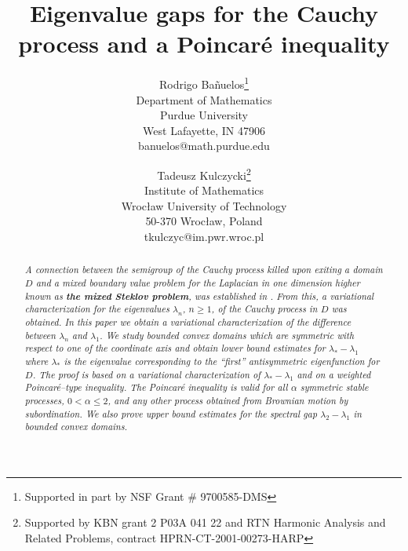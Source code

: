 \documentclass[11pt,leqno]{article}
\theoremstyle{definition}
\numberwithin{equation}{section}
\begin{document}
\newcommand{\bD}{\mathrm{I\! D\!}}


\newcommand{\al}{\alpha}
\newcommand{\ga}{\gamma}
\newcommand{\om}{\omega}
\newcommand{\G}{\Gamma}
\def\rayo{\leftarrow}
\def\tr{\triangle}
\newtheorem{cl}{Claim}
\newcommand{\bR}{\mathbf{R}}

\theoremstyle{definition}
\newtheorem{fact}{Fact} \renewcommand{\thefact}{}



\begin{titlepage}
\title{\bf  Eigenvalue  gaps for the Cauchy process and a Poincar\'e inequality}
\author{Rodrigo Ba\~nuelos\thanks{Supported in part by NSF Grant
\# 9700585-DMS}\\Department of  Mathematics
\\Purdue University\\West Lafayette, IN
47906\\banuelos@math.purdue.edu\and Tadeusz  Kulczycki\thanks{Supported by KBN 
grant 2 P03A 041 22
and RTN Harmonic Analysis and  Related Problems, contract 
HPRN-CT-2001-00273-HARP}
\\Institute of Mathematics\\ Wroc{\l}aw
University of Technology\\ 50-370 Wroc{\l}aw, Poland\\
tkulczyc@im.pwr.wroc.pl}
\date{}
\maketitle


\begin{abstract}
{\it   A connection  between
the semigroup of the Cauchy process killed upon exiting a domain $D$ and a mixed boundary
value problem for the Laplacian in one dimension higher known as 
{\bf the mixed Steklov
problem}, was established in \cite{BK}.  From this, a variational characterization for
the eigenvalues $\lambda_n$, $n\geq 1$,  of the Cauchy process in $D$ was obtained. 
 In this paper
 we obtain a variational
characterization of the difference between  $\lambda_n$ and $\lambda_1$.  We study
bounded convex domains which are symmetric with respect to one of the coordinate axis  and
obtain lower bound estimates for $\lambda_* - \lambda_1$ where $\lambda_*$ is the
eigenvalue corresponding to the ``first'' antisymmetric eigenfunction for $D$. 
The proof is based on a 
variational characterization of $\lambda_* - \lambda_1$ and on a weighted 
Poincar\'e--type inequality.  The Poincar\'e  inequality is  valid for all  $\alpha$
symmetric stable processes, $0<\alpha\leq 2$,  and  any other process obtained from
Brownian motion by subordination.  We also  prove upper bound estimates for the spectral
gap $\lambda_2-\lambda_1$ in bounded  convex domains.}


\end{abstract}
\end{titlepage}
\end{document}
